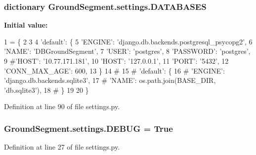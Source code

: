 \subsubsection[{D\+A\+T\+A\+B\+A\+S\+E\+S}]{\setlength{\rightskip}{0pt plus 5cm}dictionary Ground\+Segment.\+settings.\+D\+A\+T\+A\+B\+A\+S\+E\+S}\label{namespace_ground_segment_1_1settings_a73f9e9739e7dccd65add635931f4f98e}
{\bfseries Initial value\+:}
\begin{DoxyCode}
1 = \{
2    
3 
4     \textcolor{stringliteral}{'default'}: \{
5                 \textcolor{stringliteral}{'ENGINE'}: \textcolor{stringliteral}{'django.db.backends.postgresql\_psycopg2'},
6                 \textcolor{stringliteral}{'NAME'}: \textcolor{stringliteral}{'DBGroundSegment'},
7                 \textcolor{stringliteral}{'USER'}: \textcolor{stringliteral}{'postgres'},
8                 \textcolor{stringliteral}{'PASSWORD'}: \textcolor{stringliteral}{'postgres'},
9                 \textcolor{comment}{#'HOST': '10.77.171.181',}
10                 \textcolor{stringliteral}{'HOST'}: \textcolor{stringliteral}{'127.0.0.1'},
11                 \textcolor{stringliteral}{'PORT'}: \textcolor{stringliteral}{'5432'},
12                 \textcolor{stringliteral}{'CONN\_MAX\_AGE'}: 600,
13          \}
14 \textcolor{comment}{#     }
15 \textcolor{comment}{#     'default': \{}
16 \textcolor{comment}{#          'ENGINE': 'django.db.backends.sqlite3',}
17 \textcolor{comment}{#          'NAME': os.path.join(BASE\_DIR, 'db.sqlite3'),}
18 \textcolor{comment}{#      \}}
19      
20 \}
\end{DoxyCode}


Definition at line 90 of file settings.\+py.

\hypertarget{namespace_ground_segment_1_1settings_a7398b478a987ae21647fbb08b265ad10}{}
\subsubsection[{D\+E\+B\+U\+G}]{\setlength{\rightskip}{0pt plus 5cm}Ground\+Segment.\+settings.\+D\+E\+B\+U\+G = True}\label{namespace_ground_segment_1_1settings_a7398b478a987ae21647fbb08b265ad10}


Definition at line 27 of file settings.\+py.

\hypertarget{namespace_ground_segment_1_1settings_ac016a8ca7717627c7aa8538920482b88}{}
